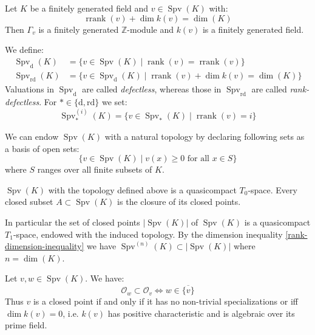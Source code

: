 \begin{lemma}\label{dimension-equality}
Let $K$ be a finitely generated field and $v\in\operatorname{Spv}(K)$ with:
\[\operatorname{rrank}(v)+\dim k(v)= \dim(K) \]
Then $\Gamma_v$ is a finitely generated $\mathbb{Z}$-module and $k(v)$ is a finitely generated field.
\end{lemma}

\begin{definition}
We define:
\begin{align*}
\operatorname{Spv}_\text{d}(K) &= \{v\in\operatorname{Spv}(K)\mid\operatorname{rank}(v)=\operatorname{rrank}(v) \} \\
\operatorname{Spv}_\text{rd}(K) &= \{v\in\operatorname{Spv}_\text{d}(K)\mid \operatorname{rrank}(v)+\dim k(v)=\dim(K) \}
\end{align*}
Valuations in $\operatorname{Spv}_\text{d}$ are called \textit{defectless}, whereas those in $\operatorname{Spv}_\text{rd}$ are called \textit{rank-defectless}. For $\ast\in\{\text{d},\text{rd}\}$ we set:
\[\operatorname{Spv}_\ast^{(i)}(K)=\{v\in\operatorname{Spv}_\ast(K)\mid \operatorname{rrank}(v)=i \} \]
\end{definition}

\begin{definition}
We can endow $\operatorname{Spv}(K)$ with a natural topology by declaring following sets as a basis of open sets:
\[\{v\in\operatorname{Spv}(K)\mid v(x)\geq 0\text{ for all }x\in S\} \]
where $S$ ranges over all finite subsets of $K$. 
\end{definition}

\begin{lemma}
$\operatorname{Spv}(K)$ with the topology defined above is a quasicompact $T_0$-space. Every closed subset $A\subset\operatorname{Spv}(K)$ is the closure of its closed points. 

In particular the set of closed points $|\operatorname{Spv}(K)|$ of $\operatorname{Spv}(K)$ is a quasicompact $T_1$-space, endowed with the induced topology. By the dimension inequality \ref{rank-dimension-inequality} we have $\operatorname{Spv}^{(n)}(K)\subset |\operatorname{Spv}(K)|$ where $n=\dim(K)$.
\end{lemma}

\begin{lemma}\label{2.2-prepre}
Let $v,w\in\operatorname{Spv}(K)$. We have:
\[\mathcal{O}_w\subset\mathcal{O}_v \iff w\in\overline{\{v\}} \]
Thus $v$ is a closed point if and only if it has no non-trivial specializations or iff $\dim k(v)=0$, i.e. $k(v)$ has positive characteristic and is algebraic over its prime field.
\end{lemma}

